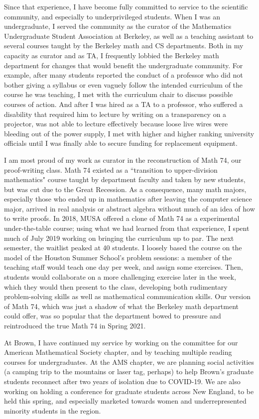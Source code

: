 \documentclass[11pt]{article}
\begin{document}
Since that experience, I have become fully committed to service to the scientific community, and especially to underprivileged students.
When I was an undergraduate, I served the community as the curator of the Mathematics Undergraduate Student Association at Berkeley, as well as a teaching assistant to several courses taught by the Berkeley math and CS departments.
Both in my capacity as curator and as TA, I frequently lobbied the Berkeley math department for changes that would benefit the undergraduate community.
For example, after many students reported the conduct of a professor who did not bother giving a syllabus or even vaguely follow the intended curriculum of the course he was teaching, I met with the curriculum chair to discuss possible courses of action.
And after I was hired as a TA to a professor, who suffered a disability that required him to lecture by writing on a transparency on a projector, was not able to lecture effectively because loose live wires were bleeding out of the power supply, I met with higher and higher ranking university officials until I was finally able to secure funding for replacement equipment.

I am most proud of my work as curator in the reconstruction of Math 74, our proof-writing class.
Math 74 existed as a ``transition to upper-division mathematics" course taught by department faculty and taken by new students, but was cut due to the Great Recession.
As a consequence, many math majors, especially those who ended up in mathematics after leaving the computer science major, arrived in real analysis or abstract algebra without much of an idea of how to write proofs.
In 2018, MUSA offered a clone of Math 74 as a experimental under-the-table course; using what we had learned from that experience, I spent much of July 2019 working on bringing the curriculum up to par.
The next semester, the waitlist peaked at 40 students.
I loosely based the course on the model of the Houston Summer School's problem sessions: a member of the teaching staff would teach one day per week, and assign some exercises.
Then, students would collaborate on a more challenging exercise later in the week, which they would then present to the class, developing both rudimentary problem-solving skills as well as mathematical communication skills.
Our version of Math 74, which was just a shadow of what the Berkeley math department could offer, was so popular that the department bowed to pressure and reintroduced the true Math 74 in Spring 2021.

At Brown, I have continued my service by working on the committee for our American Mathematical Society chapter, and by teaching multiple reading courses for undergraduates.
At the AMS chapter, we are planning social activities (a camping trip to the mountains or laser tag, perhaps) to help Brown's graduate students reconnect after two years of isolation due to COVID-19.
We are also working on holding a conference for graduate students across New England, to be held this spring, and especially marketed towards women and underrepresented minority students in the region.
\end{document}
